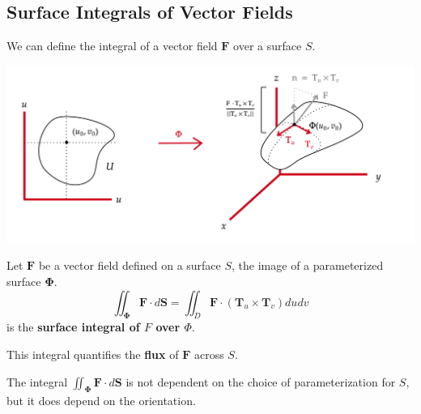 \subsection{Surface Integrals of Vector Fields}
We can define the integral of a vector field $\mathbf{F}$ over a surface $S$.

	\begin{center}
	\includegraphics[width=\linewidth]{figures/wk-6/fig-19.png}
	\end{center}

\begin{defn}
	\sloppy Let $\mathbf{F}$ be a vector field defined on a surface $S$, the image of a parameterized surface $\mathbf{\Phi}$.
	\[\iint_{\boldsymbol{\Phi}} \mathbf{F} \cdot d \mathbf{S}=\iint_D \mathbf{F} \cdot\left(\mathbf{T}_u \times \mathbf{T}_v\right) d u d v\]
	is the \textbf{surface integral of $F$ over $\Phi$}.
\end{defn}

\begin{rmk}
	This integral quantifies the \textbf{flux} of $\mathbf{F}$ across $S$.
\end{rmk}

\begin{rmk}
	The integral $\iint_{\boldsymbol{\Phi}} \mathbf{F} \cdot d \mathbf{S}$ is not dependent on the choice of parameterization for $S$, but it does depend on the orientation.
\end{rmk}


